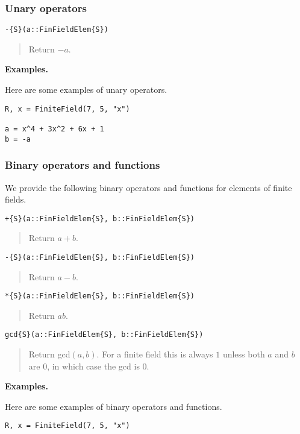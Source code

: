 \documentclass[a4paper,10pt]{article}
\newcommand{\desc}[1]{\vspace{-3mm}\begin{quote}#1\end{quote}}
\begin{document}
{{{\subsubsection{Unary operators}

\begin{lstlisting}
-{S}(a::FinFieldElem{S})
\end{lstlisting}

\desc{Return $-a$.}

\textbf{Examples.}

Here are some examples of unary operators.

\begin{lstlisting}
R, x = FiniteField(7, 5, "x")

a = x^4 + 3x^2 + 6x + 1
b = -a
\end{lstlisting}

\subsubsection{Binary operators and functions}

We provide the following binary operators and functions for elements of
finite fields.

\begin{lstlisting}
+{S}(a::FinFieldElem{S}, b::FinFieldElem{S})
\end{lstlisting}

\desc{Return $a + b$.}

\begin{lstlisting}
-{S}(a::FinFieldElem{S}, b::FinFieldElem{S})
\end{lstlisting}

\desc{Return $a - b$.}

\begin{lstlisting}
*{S}(a::FinFieldElem{S}, b::FinFieldElem{S})
\end{lstlisting}

\desc{Return $ab$.}

\begin{lstlisting}
gcd{S}(a::FinFieldElem{S}, b::FinFieldElem{S})
\end{lstlisting}

\desc{Return gcd$(a, b)$. For a finite field this is always $1$ unless both
$a$ and $b$ are $0$, in which case the gcd is $0$.}

\textbf{Examples.}

Here are some examples of binary operators and functions.

\begin{lstlisting}
R, x = FiniteField(7, 5, "x")


\end{lstlisting}}}}
\end{document}

